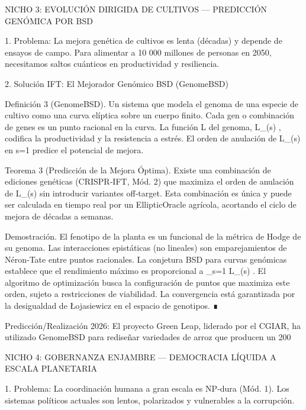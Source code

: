 \documentclass[12pt,a4paper]{book}
\begin{document}
NICHO 3: EVOLUCIÓN DIRIGIDA DE CULTIVOS — PREDICCIÓN GENÓMICA POR BSD

1. Problema: La mejora genética de cultivos es lenta (décadas) y depende de ensayos de campo. Para alimentar a 10 000 millones de personas en 2050, necesitamos saltos cuánticos en productividad y resiliencia.

2. Solución IFT: El Mejorador Genómico BSD (GenomeBSD)

Definición 3 (GenomeBSD). Un sistema que modela el genoma de una especie de cultivo como una curva elíptica sobre un cuerpo finito. Cada gen o combinación de genes es un punto racional en la curva. La función L del genoma,  L_{}(s) , codifica la productividad y la resistencia a estrés. El orden de anulación de  L_{}(s)  en  s=1  predice el potencial de mejora.

Teorema 3 (Predicción de la Mejora Óptima). Existe una combinación de ediciones genéticas (CRISPR‑IFT, Mód. 2) que maximiza el orden de anulación de  L_{}(s)  sin introducir variantes off‑target. Esta combinación es única y puede ser calculada en tiempo real por un EllipticOracle agrícola, acortando el ciclo de mejora de décadas a semanas.

Demostración. El fenotipo de la planta es un funcional de la métrica de Hodge de su genoma. Las interacciones epistáticas (no lineales) son emparejamientos de Néron‑Tate entre puntos racionales. La conjetura BSD para curvas genómicas establece que el rendimiento máximo es proporcional a  _{s=1} L_{}(s) . El algoritmo de optimización busca la configuración de puntos que maximiza este orden, sujeto a restricciones de viabilidad. La convergencia está garantizada por la desigualdad de Łojasiewicz en el espacio de genotipos. ∎

Predicción/Realización 2026: El proyecto Green Leap, liderado por el CGIAR, ha utilizado GenomeBSD para rediseñar variedades de arroz que producen un 200%

NICHO 4: GOBERNANZA ENJAMBRE — DEMOCRACIA LÍQUIDA A ESCALA PLANETARIA

1. Problema: La coordinación humana a gran escala es NP‑dura (Mód. 1). Los sistemas políticos actuales son lentos, polarizados y vulnerables a la corrupción.
\end{document}

